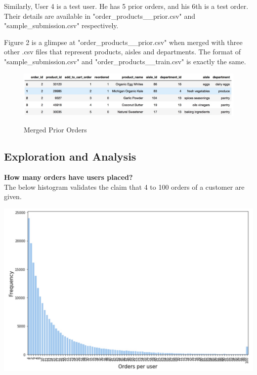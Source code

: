 \documentclass[12pt]{article}
\begin{document}
Similarly, User 4 is a test user. He has 5 prior orders, and his 6th is a test order. Their details are available in "order\_products\_\_prior.csv" and "sample\_submission.csv" respectively.

Figure 2 is a glimpse at "order\_products\_\_prior.csv" when merged with three other .csv files that represent products, aisles and departments. The format of "sample\_submission.csv" and "order\_products\_\_train.csv" is exactly the same.

\begin{figure}
	\includegraphics[scale=0.3]{prior_df_merged} \\
	\caption{Merged Prior Orders}
\end{figure}


\subsection*{Exploration and Analysis}

\noindent
\textbf{How many orders have users placed?} \\
The below histogram validates the claim that 4 to 100 orders of a customer are given.
\begin{center}
	\includegraphics[scale=0.2]{order_user}
\end{center}
\end{document}

